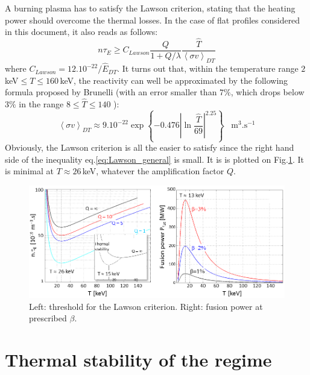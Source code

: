 A burning plasma has to satisfy the Lawson criterion, stating that the heating power should overcome the thermal losses. In the case of flat profiles considered in this document, it also reads as follows:
\begin{equation}
 \label{eq:Lawson_general}
 n\tau_E \geq C_{Lawson} 
 \frac{Q}{1+Q/\lambda}
 \frac{\hat T}{\left< \sigma v \right>_{DT}}
\end{equation}
where $C_{Lawson} = 12.10^{-22}/\hat E_{DT}$. It turns out that, within the temperature range $2\,$keV$\leq T \leq 160\,$keV, the reactivity can well be approximated by the following formula proposed by Brunelli (with an error smaller than $7\%$, which drops below $3\%$ in the range $8\leq \hat T \leq 140$ ):
\begin{equation}
  \left< \sigma v \right>_{DT} \approx 9.10^{-22}
  \exp\left\{ -0.476 \left| \ln\frac{\hat T}{69} \right|^{2.25}\right\}
  \;\;\;\textrm{m}^3.\textrm{s}^{-1}
\end{equation}
Obviously, the Lawson criterion is all the easier to satisfy since the right hand side of the inequality eq.\ref{eq:Lawson_general} is small. It is is plotted on Fig.\ref{fig:ntauE_Pfus_Tchoice}. It is minimal at $T\approx 26\,$keV, whatever the amplification factor $Q$.

\begin{figure} 
	\centering
		\includegraphics{figures/Fig_ntauE_Pfus_Tchoice_v3.png}
		\caption{Left: threshold for the Lawson criterion. Right: fusion power at prescribed $\beta$.}
		\label{fig:ntauE_Pfus_Tchoice}
\end{figure}


\section{Thermal stability of the regime}\label{sec:thermal_stability}

